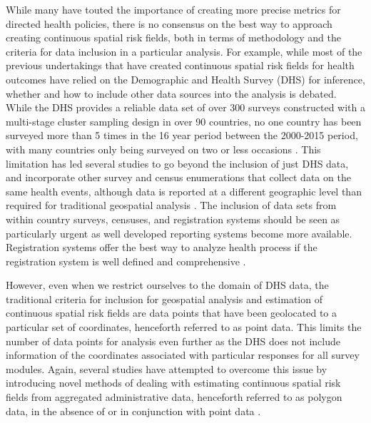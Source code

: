 \documentclass{article}
\begin{document}
While many have touted the importance of creating more precise metrics for directed health policies\cite{Bhutta2016, Desmond-Hellmann2016}, there is no consensus on the best way to approach creating continuous spatial risk fields, both in terms of methodology and the criteria for data inclusion in a particular analysis. For example, while most of the previous undertakings that have created continuous spatial risk fields for health outcomes have relied on the Demographic and Health Survey (DHS) for inference, whether and how to include other data sources into the analysis is debated. While the DHS provides a reliable data set of over 300 surveys constructed with a multi-stage cluster sampling design in over 90 countries, no one country has been surveyed more than 5 times in the 16 year period between the 2000-2015 period, with many countries only being surveyed on two or less occasions \cite{Burgert-Brucker2016, Gething2015}. This limitation has led several studies to go beyond the inclusion of just DHS data, and incorporate other survey and census enumerations that collect data on the same health events, although data is reported at a different geographic level than required for traditional geospatial analysis \cite{Golding2017, Reiner2018}. The inclusion of data sets from within country surveys, censuses, and registration systems should be seen as particularly urgent as well developed reporting systems become more available. Registration systems offer the best way to analyze health process if the registration system is well defined and comprehensive \cite{AbouZahr2015}.

However, even when we restrict ourselves to the domain of DHS data, the traditional criteria for inclusion for geospatial analysis and estimation of continuous spatial risk fields are data points that have been geolocated to a particular set of coordinates, henceforth referred to as point data. This limits the number of data points for analysis even further as the DHS does not include information of the coordinates associated with particular responses for all survey modules. Again, several studies have attempted to overcome this issue by introducing novel methods of dealing with estimating continuous spatial risk fields from aggregated administrative data, henceforth referred to as polygon data, in the absence of or in conjunction with point data \cite{Golding2017, Reiner2018, Utazi2018a}. 
\end{document}

